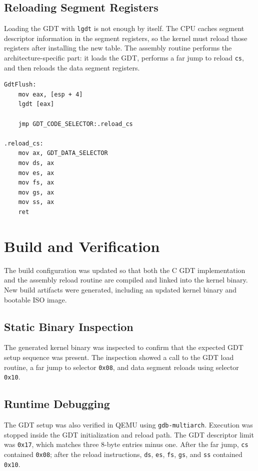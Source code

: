 \subsection{Reloading Segment Registers}
Loading the GDT with \texttt{lgdt} is not enough by itself. The CPU caches segment descriptor information in the segment registers, so the kernel must reload those registers after installing the new table. The assembly routine performs the architecture-specific part: it loads the GDT, performs a far jump to reload \texttt{cs}, and then reloads the data segment registers\cite{osdevGdtTutorial}.

\begin{listing}[H]
\begin{verbatim}
GdtFlush:
    mov eax, [esp + 4]
    lgdt [eax]

    jmp GDT_CODE_SELECTOR:.reload_cs

.reload_cs:
    mov ax, GDT_DATA_SELECTOR
    mov ds, ax
    mov es, ax
    mov fs, ax
    mov gs, ax
    mov ss, ax
    ret
\end{verbatim}
\caption{Loading the GDT and refreshing the cached code and data segment registers.}
\end{listing}

\section{Build and Verification}

The build configuration was updated so that both the C GDT implementation and the assembly reload routine are compiled and linked into the kernel binary. New build artifacts were generated, including an updated kernel binary and bootable ISO image.

\subsection{Static Binary Inspection}
The generated kernel binary was inspected to confirm that the expected GDT setup sequence was present. The inspection showed a call to the GDT load routine, a far jump to selector \texttt{0x08}, and data segment reloads using selector \texttt{0x10}.

\subsection{Runtime Debugging}
The GDT setup was also verified in QEMU using \texttt{gdb-multiarch}. Execution was stopped inside the GDT initialization and reload path. The GDT descriptor limit was \texttt{0x17}, which matches three 8-byte entries minus one. After the far jump, \texttt{cs} contained \texttt{0x08}; after the reload instructions, \texttt{ds}, \texttt{es}, \texttt{fs}, \texttt{gs}, and \texttt{ss} contained \texttt{0x10}.
\clearpage

